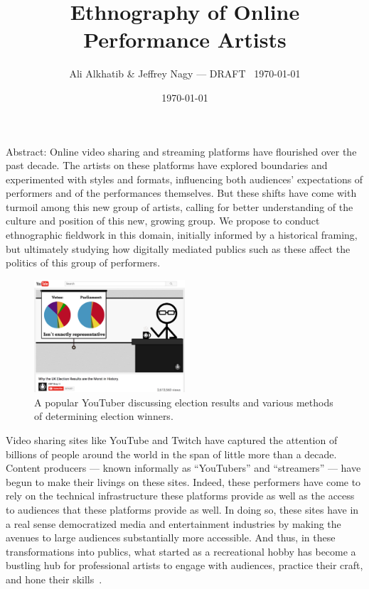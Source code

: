 \documentclass[10pt]{article}
\title{Ethnography of Online Performance Artists}
\author{Ali Alkhatib \& Jeffrey Nagy
--- DRAFT \DTMcurrenttime~\today}
\date{\today}
\makeatletter
\renewcommand{\maketitle}{\bgroup\setlength{\parindent}{0pt}
\begin{flushleft}
  {\scshape \LARGE \textbf{\@title}}

  \@author
\end{flushleft}\egroup
}
\renewenvironment{abstract}{%
\hfill\begin{minipage}{0.95\textwidth}
\itshape
}
{
\bigskip
\end{minipage}}
\makeatother
\begin{document}
  \maketitle
  \begin{abstract}
  Abstract: Online video sharing and streaming platforms have flourished over the past decade.
  The artists on these platforms have
  explored boundaries and experimented with styles and formats,
  influencing both audiences' expectations of performers and of the performances themselves.
  But these shifts have come with turmoil among this new group of artists,
  calling for better understanding of the culture and position of this new, growing group.
  We propose to conduct ethnographic fieldwork in this domain,
  initially informed by a historical framing, but
  ultimately studying how digitally mediated publics such as these affect
  the politics of this group of performers.
  \end{abstract}

\begin{figure}
\centering
\includegraphics[width=0.5\textwidth]{figures/cgpgrey.png}
\caption{\label{fig:Magic}A popular YouTuber discussing election results and various methods of determining election winners.}
\end{figure}
Video sharing sites like YouTube and Twitch
have captured the attention of billions of people around the world
in the span of little more than a decade.
Content producers
--- known informally as ``YouTubers'' and ``streamers'' ---
have begun to make their livings on these sites.
Indeed, these performers have come to rely on
the technical infrastructure these platforms provide as well as
the access to audiences that these platforms provide as well.
In doing so, these sites have in a real sense democratized media and entertainment industries by
making the avenues to large audiences substantially more accessible.
And thus, in these transformations into publics, what started as
a recreational hobby
has become a bustling hub for professional artists to
engage with audiences,
practice their craft, and 
hone their skills~\cite{Hamilton:2014:STF:2611105.2557048,Zhang:2015:CIL:2736084.2736091}.
\end{document}
